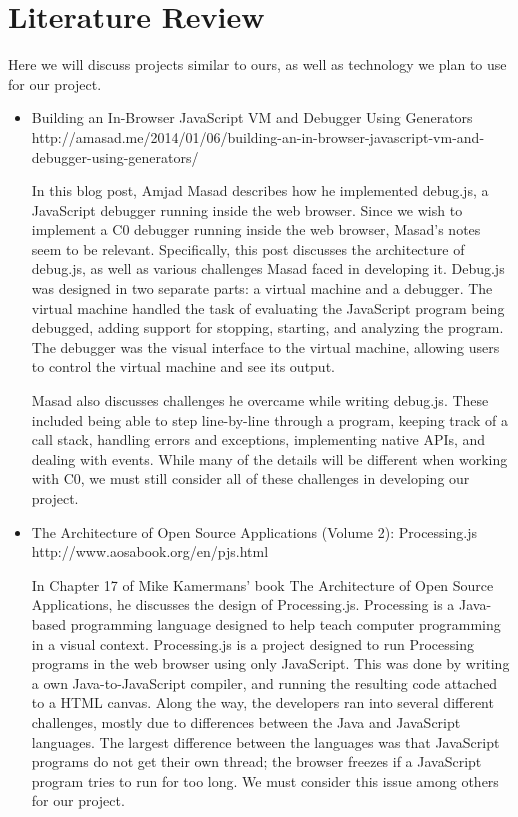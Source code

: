 \documentclass[11pt]{article}
\begin{document}
\section{Literature Review}
\par
Here we will discuss projects similar to ours, as well as technology
we plan to use for our project.
\begin{itemize}
\item Building an In-Browser JavaScript VM and Debugger Using Generators\\
  http://amasad.me/2014/01/06/building-an-in-browser-javascript-vm-and-debugger-using-generators/
  \par
  In this blog post, Amjad Masad describes how he implemented
  debug.js, a JavaScript debugger running inside the web
  browser. Since we wish to implement a C0 debugger running inside the
  web browser, Masad's notes seem to be relevant.  Specifically, this
  post discusses the architecture of debug.js, as well as various
  challenges Masad faced in developing it.  Debug.js was designed in
  two separate parts: a virtual machine and a debugger. The virtual
  machine handled the task of evaluating the JavaScript program being
  debugged, adding support for stopping, starting, and analyzing the
  program. The debugger was the visual interface to the virtual
  machine, allowing users to control the virtual machine and see its
  output.
  \par
  Masad also discusses challenges he overcame while writing
  debug.js. These included being able to step line-by-line through a
  program, keeping track of a call stack, handling errors and
  exceptions, implementing native APIs, and dealing with events. While
  many of the details will be different when working with C0, we must
  still consider all of these challenges in developing our project.

\item The Architecture of Open Source Applications (Volume 2): Processing.js\\
  http://www.aosabook.org/en/pjs.html
  \par
  In Chapter 17 of Mike Kamermans' book The Architecture of Open
  Source Applications, he discusses the design of
  Processing.js. Processing is a Java-based programming language
  designed to help teach computer programming in a visual
  context. Processing.js is a project designed to run Processing
  programs in the web browser using only JavaScript.  This was done by
  writing a own Java-to-JavaScript compiler, and running the resulting
  code attached to a HTML canvas.  Along the way, the developers ran
  into several different challenges, mostly due to differences between
  the Java and JavaScript languages.  The largest difference between
  the languages was that JavaScript programs do not get their own
  thread; the browser freezes if a JavaScript program tries to run for
  too long.  We must consider this issue among others for our project.


\end{itemize}
\end{document}
